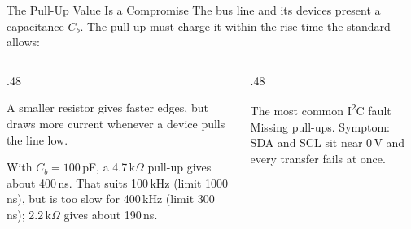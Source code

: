 \documentclass[9pt,aspectratio=169,xcolor=table]{beamer}
\begin{document}
\begin{frame}{The Pull-Up Value Is a Compromise}
    \leavevmode
    The bus line and its devices present a capacitance $C_b$. The pull-up must charge it within the rise time the standard allows:

    \vspace{2mm}
    \begin{center}
    \end{center}

    \vspace{2mm}
    \begin{columns}[T]
    \begin{column}{.48\textwidth}
        {\small A smaller resistor gives faster edges, but draws more current whenever a device pulls the line low.

        \vspace{2mm}
        With $C_b = 100$\,pF, a 4.7\,k$\Omega$ pull-up gives about 400\,ns. That suits 100\,kHz (limit 1000\,ns), but is too slow for 400\,kHz (limit 300\,ns); 2.2\,k$\Omega$ gives about 190\,ns.}
    \end{column}
    \begin{column}{.48\textwidth}
        \begin{block}{The most common I\textsuperscript{2}C fault}
            {\small \alert{Missing pull-ups.} Symptom: SDA and SCL sit near 0\,V and every transfer fails at once.}
        \end{block}
    \end{column}
    \end{columns}
\end{frame}
\end{document}

